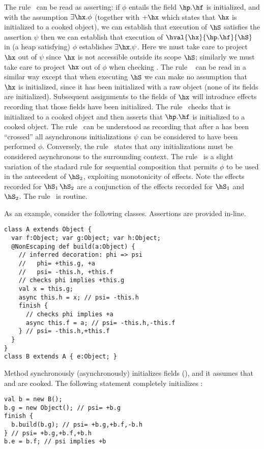 The rule~ can be read as asserting: if $\phi$ entails
the field $\hp.\hf$ is initialized, and with the assumption $\exists \hx.\phi$
(together with $+\hx$ which states that $\hx$ is initialized to a
cooked object), we can establish that execution of $\hS$ satisfies the assertion
$\psi$ then we can establish that execution of
$\hval{\hx}{\hp.\hf}{\hS}$ in
(a heap satisfying) $\phi$ establishes $\exists \hx.\psi$. Here we
must take care to project $\hx$ out of $\psi$ since $\hx$ is not
accessible outside its scope $\hS$; similarly we must take care to
project $\hx$ out of $\phi$ when checking \hS.
The rule ~ can be read in a similar way except that when
executing $\hS$ we can make no assumption that $\hx$ is initialized,
since it has been initialized with a raw object (none of its fields
are initialized). Subsequent assignments to the fields of $\hx$ will
introduce effects recording that those fields have been initialized.
The rule~ checks that \hq{} is initialized to a
cooked object and then asserts that $\hp.\hf$ is initialized to a
cooked object.
The rule~ can be understood as recording that after a
\finish{} has been ``crossed'' all asynchronous initializations $\psi$
can be considered to have been performed $\phi$. Conversely,
the rule~ states that any initializations must be
considered asynchronous to the surrounding context.
The rule~ is a slight variation of the stadard rule for
sequential composition that permits $\phi$ to be used in the
antecedent of $\hS_2$, exploiting monotonicity of effects. Note the
effects recorded for $\hS_1\,\hS_2$ are a conjunction of the effects
recorded for $\hS_1$ and $\hS_2$. 
The rule~ is routine.

As an example, consider the following classes. Assertions are provided
in-line.
\begin{lstlisting}
class A extends Object {
  var f:Object; var g:Object; var h:Object;
  @NonEscaping def build(a:Object) {
    // inferred decoration: phi => psi
    //   phi= +this.g, +a
    //   psi= -this.h, +this.f
    // checks phi implies +this.g
    val x = this.g;
    async this.h = x; // psi= -this.h
    finish {
      // checks phi implies +a
      async this.f = a; // psi= -this.h,-this.f
    } // psi= -this.h,+this.f
  }
}
class B extends A { e:Object; }
\end{lstlisting}
Method  synchronously (asynchronously) initializes fields  (),
    and it assumes that  and  are cooked.
The following statement completely initializes :
\begin{lstlisting}
val b = new B();
b.g = new Object(); // psi= +b.g
finish {
  b.build(b.g); // psi= +b.g,+b.f,-b.h
} // psi= +b.g,+b.f,+b.h
b.e = b.f; // psi implies +b
\end{lstlisting}


